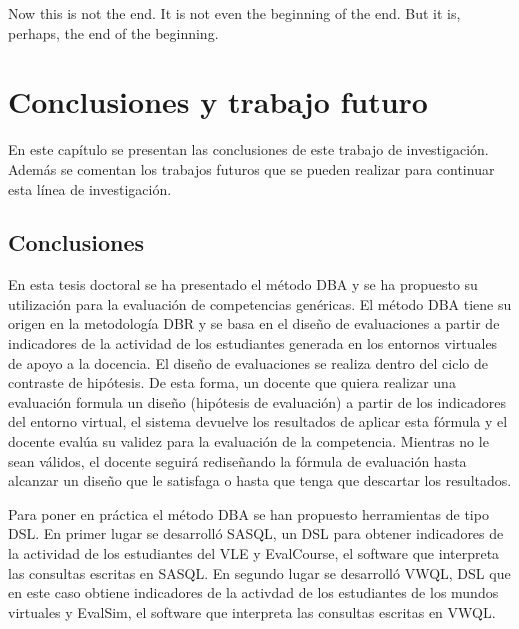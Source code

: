 

\begin{savequote}[50mm]
Now this is not the end. It is not even the beginning of the end. But it is, perhaps, the end of the beginning. 
\end{savequote}


\chapter{Conclusiones y trabajo futuro}
\label{cha:Conclusions}

\ifpdf
    \graphicspath{{6_conclusion/figures/PNG/}{6_conclusion/figures/PDF/}{6_conclusion/figures/}}
\else
    \graphicspath{{6_conclusion/figures/EPS/}{6_conclusion/figures/}}
\fi


En este capítulo se presentan las conclusiones de este trabajo de investigación. Además se comentan los trabajos futuros que se pueden realizar para continuar esta línea de investigación.


\section{Conclusiones}

En esta tesis doctoral se ha presentado el método DBA y se ha propuesto su utilización para la evaluación de competencias genéricas. El método DBA tiene su origen en la metodología DBR y se basa en el diseño de evaluaciones a partir de indicadores de la actividad de los estudiantes generada en los entornos virtuales de apoyo a la docencia. El diseño de evaluaciones se realiza dentro del ciclo de contraste de hipótesis. De esta forma, un docente que quiera realizar una evaluación formula un diseño (hipótesis de evaluación) a partir de los indicadores del entorno virtual, el sistema devuelve los resultados de aplicar esta fórmula y el docente evalúa su validez para la evaluación de la competencia. Mientras no le sean válidos, el docente seguirá rediseñando la fórmula de evaluación hasta alcanzar un diseño que le satisfaga o hasta que tenga que descartar los resultados.

Para poner en práctica el método DBA se han propuesto herramientas de tipo DSL. En primer lugar se desarrolló SASQL, un DSL para obtener indicadores de la actividad de los estudiantes del VLE y EvalCourse, el software que interpreta las consultas escritas en SASQL. En segundo lugar se desarrolló VWQL, DSL que en este caso obtiene indicadores de la activdad de los estudiantes de los mundos virtuales y EvalSim, el software que interpreta las consultas escritas en VWQL.

